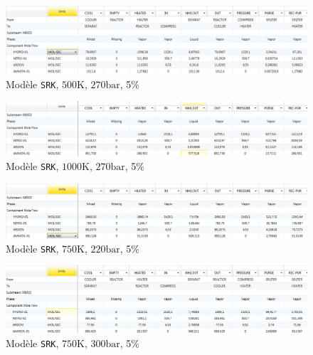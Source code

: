 \begin{figure}[h!]
	\begin{center}
		\includegraphics[scale=0.5]{SRK,500,270.png}
	\end{center}
	\caption{Modèle \texttt{SRK}, $500\si{\kelvin}$, $270\si{\bar}$, 5\%}
	\label{fig:SRK,500,270,0.05}
\end{figure}

\begin{figure}[h!]
	\begin{center}
		\includegraphics[scale=0.5]{SRK,1000,270.png}
	\end{center}
	\caption{Modèle \texttt{SRK}, $1000\si{\kelvin}$, $270\si{\bar}$, 5\%}
	\label{fig:SRK,1000,270,0.05}
\end{figure}

\begin{figure}[h!]
	\begin{center}
		\includegraphics[scale=0.5]{SRK,750,220.png}
	\end{center}
	\caption{Modèle \texttt{SRK}, $750\si{\kelvin}$, $220\si{\bar}$, 5\%}
	\label{fig:SRK,750,220,0.05}
\end{figure}

\begin{figure}[h!]
	\begin{center}
		\includegraphics[scale=0.5]{SRK,750,300.png}
	\end{center}
	\caption{Modèle \texttt{SRK}, $750\si{\kelvin}$, $300\si{\bar}$, 5\%}
	\label{fig:SRK,750,300,0.05}
\end{figure}

